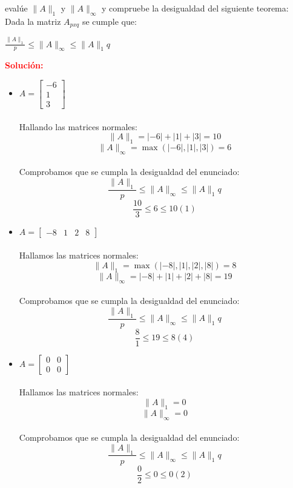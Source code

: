 \documentclass[12pt]{article}
\begin{document}
evalúe $\|A\|_1$ y $\|A\|_\infty$ y compruebe la desigualdad del siguiente teorema:\\
Dada la matriz  $A_{pxq}$ se cumple que:\\
\begin{center}
$\frac{\|A\|_1}{p}  \leq \|A\|_\infty \leq \|A\|_1 q$
\end{center}
\noindent \textcolor{red}{\bf Solución:}
\begin{itemize}
    \item $A=\left[\begin{array}{c}
        -6 \\
        1\\
        3
    \end{array}\right]$ \\
    \\
    Hallando las matrices normales:\\
    \[\|A\|_1 = |-6| + |1| + |3| = 10\]
    \[\|A\|_\infty = \max{(|-6|,|1|,|3|)} = 6\]
    \\
    Comprobamos que se cumpla la desigualdad del enunciado:\\
    \[\frac{\|A\|_1}{p}  \leq \|A\|_\infty \leq \|A\|_1 q\]
    \[\frac{10}{3}  \leq 6 \leq 10(1)\]
    
    \item $A=\left[\begin{array}{cccc}
        -8&1&2&8\end{array}\right]$ \\
    \\
    Hallamos las matrices normales:\\
    \[\|A\|_1 = \max{(|-8|,|1|,|2|,|8|)} = 8\]
    \[\|A\|_\infty = |-8|+|1|+|2|+|8| = 19\]
    \\
    Comprobamos que se cumpla la desigualdad del enunciado:\\
    \[\frac{\|A\|_1}{p}  \leq \|A\|_\infty \leq \|A\|_1 q\]
    \[\frac{8}{1}  \leq 19 \leq 8(4)\]
    
    \item $A=\left[\begin{array}{cc}
        0&0\\
        0&0\end{array}\right]$ \\
    \\
    Hallamos las matrices normales:\\
    \[\|A\|_1 = 0\]
    \[\|A\|_\infty = 0\]
    \\
    Comprobamos que se cumpla la desigualdad del enunciado:\\
    \[\frac{\|A\|_1}{p}  \leq \|A\|_\infty \leq \|A\|_1 q\]
    \[\frac{0}{2}  \leq 0 \leq 0(2)\]
    

\end{itemize}
\end{document}
